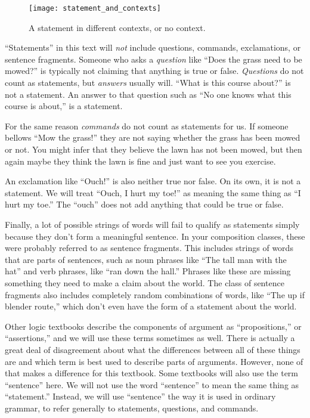 \begin{figure*}
\texttt{[image: statement\_and\_contexts]}
\caption{A statement in different contexts, or no context.}
\label{fig:statements_and_context}
\end{figure*}

``Statements'' in this text will \emph{not} include questions, commands, exclamations, or sentence fragments. Someone who asks a \emph{question} like ``Does the grass need to be mowed?'' is typically not claiming that anything is true or false. \emph{Questions} do not count as statements, but \emph{answers} usually will. ``What is this course about?'' is not a statement. An answer to that question such as ``No one knows what this course is about,'' is a statement.

For the same reason \emph{commands} do not count as statements for us. If someone bellows ``Mow the grass!'' they are not saying whether the grass has been mowed or not. You might infer that they believe the lawn has not been mowed, but then again maybe they think the lawn is fine and just want to see you exercise.

An exclamation like ``Ouch!'' is also neither true nor false. On its own, it is not a statement. We will treat ``Ouch, I hurt my toe!'' as meaning the same thing as ``I hurt my toe.'' The ``ouch'' does not add anything that could be true or false.

Finally, a lot of possible strings of words will fail to qualify as statements simply because they don't form a meaningful sentence. In your composition classes, these were probably referred to as sentence fragments. This includes strings of words that are parts of sentences, such as noun phrases like ``The tall man with the hat'' and verb phrases, like ``ran down the hall.'' Phrases like these are missing something they need to make a claim about the world. The class of sentence fragments also includes completely random combinations of words, like ``The up if blender route,'' which don't even have the form of a statement about the world.

Other logic textbooks describe the components of argument as ``propositions,'' or ``assertions,'' and we will use these terms sometimes as well.  There is actually a great deal of disagreement about what the differences between all of these things are and which term is best used to describe parts of arguments. However, none of that makes a difference for this textbook. Some textbooks will also use the term ``sentence'' here. We will not use the word ``sentence'' to mean the same thing as ``statement.'' Instead, we will use ``sentence'' the way it is used in ordinary grammar, to refer generally to statements, questions, and commands.

